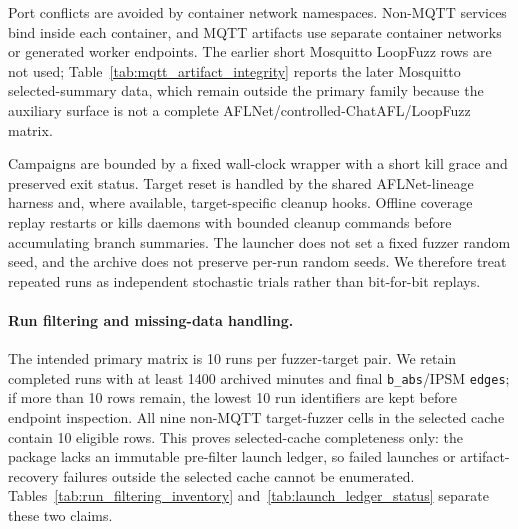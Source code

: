 \documentclass[final,5p,times,number]{elsarticle}
\begin{document}
Port conflicts are avoided by container network namespaces. Non-MQTT services bind inside each container, and MQTT artifacts use separate container networks or generated worker endpoints. The earlier short Mosquitto LoopFuzz rows are not used; Table~\ref{tab:mqtt_artifact_integrity} reports the later Mosquitto selected-summary data, which remain outside the primary family because the auxiliary surface is not a complete AFLNet/controlled-ChatAFL/LoopFuzz matrix.

Campaigns are bounded by a fixed wall-clock wrapper with a short kill grace and preserved exit status. Target reset is handled by the shared AFLNet-lineage harness and, where available, target-specific cleanup hooks. Offline coverage replay restarts or kills daemons with bounded cleanup commands before accumulating branch summaries. The launcher does not set a fixed fuzzer random seed, and the archive does not preserve per-run random seeds. We therefore treat repeated runs as independent stochastic trials rather than bit-for-bit replays.

\paragraph{Run filtering and missing-data handling.}
The intended primary matrix is 10 runs per fuzzer-target pair. We retain completed runs with at least 1400 archived minutes and final \texttt{b\_abs}/IPSM \texttt{edges}; if more than 10 rows remain, the lowest 10 run identifiers are kept before endpoint inspection. All nine non-MQTT target-fuzzer cells in the selected cache contain 10 eligible rows. This proves selected-cache completeness only: the package lacks an immutable pre-filter launch ledger, so failed launches or artifact-recovery failures outside the selected cache cannot be enumerated. Tables~\ref{tab:run_filtering_inventory} and~\ref{tab:launch_ledger_status} separate these two claims.
\end{document}

